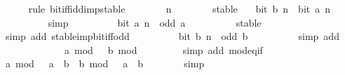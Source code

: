 \begin{isabellebody}
\ \ \ \ \isamarkupfalse%
\ {\isacharparenleft}{\kern0pt}rule\ bit{\isacharunderscore}{\kern0pt}iff{\isacharunderscore}{\kern0pt}idd{\isacharunderscore}{\kern0pt}imp{\isacharunderscore}{\kern0pt}stable{\isacharparenright}{\kern0pt}\isanewline
\ \ \ \ \ \ \isamarkupfalse%
\ n\isanewline
\ \ \ \ \ \ \isamarkupfalse%
\ stable\ \isamarkupfalse%
\ {\isacharasterisk}{\kern0pt}{\isacharcolon}{\kern0pt}\ {\isacartoucheopen}bit\ b\ n\ {\isasymlongleftrightarrow}\ bit\ a\ n{\isacartoucheclose}\isanewline
\ \ \ \ \ \ \ \ \isamarkupfalse%
\ simp\isanewline
\ \ \ \ \ \ \isamarkupfalse%
\ \isamarkupfalse%
\ {\isacartoucheopen}bit\ a\ n\ {\isasymlongleftrightarrow}\ odd\ a{\isacartoucheclose}\isanewline
\ \ \ \ \ \ \ \ \isamarkupfalse%
\ stable\ \isamarkupfalse%
\ {\isacharparenleft}{\kern0pt}simp\ add{\isacharcolon}{\kern0pt}\ stable{\isacharunderscore}{\kern0pt}imp{\isacharunderscore}{\kern0pt}bit{\isacharunderscore}{\kern0pt}iff{\isacharunderscore}{\kern0pt}odd{\isacharparenright}{\kern0pt}\isanewline
\ \ \ \ \ \ \isamarkupfalse%
\ \isamarkupfalse%
\ {\isacartoucheopen}bit\ b\ n\ {\isasymlongleftrightarrow}\ odd\ b{\isacartoucheclose}\isanewline
\ \ \ \ \ \ \ \ \isamarkupfalse%
\ {\isacharparenleft}{\kern0pt}simp\ add{\isacharcolon}{\kern0pt}\ {\isacharasterisk}{\kern0pt}{\isacharasterisk}{\kern0pt}{\isacharparenright}{\kern0pt}\isanewline
\ \ \ \ \isamarkupfalse%
\isanewline
\ \ \ \ \isamarkupfalse%
\ {\isacharasterisk}{\kern0pt}{\isacharasterisk}{\kern0pt}\ \isamarkupfalse%
\ {\isacartoucheopen}a\ mod\ {}\ {\isacharequal}{\kern0pt}\ b\ mod\ {}{\isacartoucheclose}\isanewline
\ \ \ \ \ \ \isamarkupfalse%
\ {\isacharparenleft}{\kern0pt}simp\ add{\isacharcolon}{\kern0pt}\ mod{}{\isacharunderscore}{\kern0pt}eq{\isacharunderscore}{\kern0pt}if{\isacharparenright}{\kern0pt}\isanewline
\ \ \ \ \isamarkupfalse%
\ \isamarkupfalse%
\ {\isacartoucheopen}a\ mod\ {}\ {\isacharplus}{\kern0pt}\ {\isacharparenleft}{\kern0pt}a\ {\isacharplus}{\kern0pt}\ b{\isacharparenright}{\kern0pt}\ {\isacharequal}{\kern0pt}\ b\ mod\ {}\ {\isacharplus}{\kern0pt}\ {\isacharparenleft}{\kern0pt}a\ {\isacharplus}{\kern0pt}\ b{\isacharparenright}{\kern0pt}{\isacartoucheclose}\isanewline
\ \ \ \ \ \ \isamarkupfalse%
\ simp\isanewline

\end{isabellebody}
